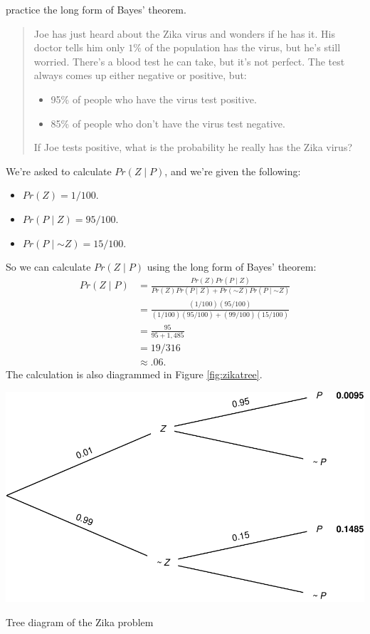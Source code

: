 \documentclass[justified]{tufte-book}
\providecommand{\tightlist}{%
  \setlength{\itemsep}{0pt}\setlength{\parskip}{0pt}}
\newcommand{\given}{\mid}
\renewcommand{\neg}{\mathbin{\sim}}
\newcommand{\p}{Pr}
\newenvironment{problem}{\begin{quote}\normalsize}{\end{quote}}
\theoremstyle{definition}
\theoremstyle{definition}
\theoremstyle{definition}
\theoremstyle{remark}
\begin{document}
 practice the long form of Bayes' theorem.

\begin{problem}
Joe has just heard about the Zika virus and wonders if he has it. His
doctor tells him only \(1\%\) of the population has the virus, but he's
still worried. There's a blood test he can take, but it's not perfect.
The test always comes up either negative or positive, but:

\begin{itemize}
\tightlist
\item
  95\% of people who have the virus test positive.
\item
  85\% of people who don't have the virus test negative.
\end{itemize}

If Joe tests positive, what is the probability he really has the Zika
virus?
\end{problem}

We're asked to calculate \(\p(Z \given P)\), and we're given the
following:

\begin{itemize}
\tightlist
\item
  \(\p(Z) = 1/100\).
\item
  \(\p(P \given Z) = 95/100\).
\item
  \(\p(P \given \neg Z) = 15/100\).
\end{itemize}

So we can calculate \(\p(Z \given P)\) using the long form of Bayes'
theorem: \[
  \begin{aligned}
    \p(Z \given P) &= \frac{\p(Z)\p(P \given Z)}{\p(Z)\p(P \given Z) + \p(\neg Z)\p(P \given \neg Z)}\\
                   &= \frac{(1/100)(95/100)}{(1/100)(95/100) + (99/100)(15/100)}\\
                   &= \frac{95}{95 + 1,485}\\
                   &= 19/316\\
                   &\approx .06.
  \end{aligned}
\] The calculation is also diagrammed in Figure \ref{fig:zikatree}.

\begin{marginfigure}
\includegraphics{_main_files/figure-latex/zikatree-1} \caption[Tree diagram of the Zika problem]{Tree diagram of the Zika problem}\label{fig:zikatree}
\end{marginfigure}
\end{document}
